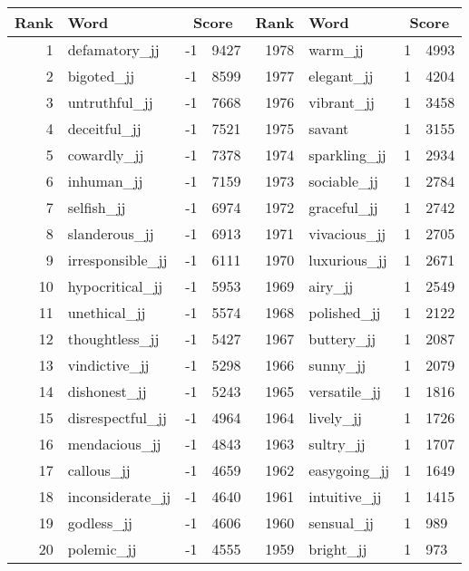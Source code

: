 \begin{table}[tbp]
    \begin{tabular}{| rlr@{.}l | rlr@{.}l |}
    \hline
    \textbf{Rank} & \textbf{Word} & \multicolumn{2}{c|}{\textbf{Score}} & \textbf{Rank} & \textbf{Word} & \multicolumn{2}{c|}{\textbf{Score}} \\
    \hline
    1 & defamatory\_jj & -1 & 9427    &    1978 & warm\_jj & 1 & 4993 \\
    2 & bigoted\_jj & -1 & 8599    &    1977 & elegant\_jj & 1 & 4204 \\
    3 & untruthful\_jj & -1 & 7668    &    1976 & vibrant\_jj & 1 & 3458 \\
    4 & deceitful\_jj & -1 & 7521    &    1975 & savant & 1 & 3155 \\
    5 & cowardly\_jj & -1 & 7378    &    1974 & sparkling\_jj & 1 & 2934 \\
    6 & inhuman\_jj & -1 & 7159    &    1973 & sociable\_jj & 1 & 2784 \\
    7 & selfish\_jj & -1 & 6974    &    1972 & graceful\_jj & 1 & 2742 \\
    8 & slanderous\_jj & -1 & 6913    &    1971 & vivacious\_jj & 1 & 2705 \\
    9 & irresponsible\_jj & -1 & 6111    &    1970 & luxurious\_jj & 1 & 2671 \\
    10 & hypocritical\_jj & -1 & 5953    &    1969 & airy\_jj & 1 & 2549 \\
    11 & unethical\_jj & -1 & 5574    &    1968 & polished\_jj & 1 & 2122 \\
    12 & thoughtless\_jj & -1 & 5427    &    1967 & buttery\_jj & 1 & 2087 \\
    13 & vindictive\_jj & -1 & 5298    &    1966 & sunny\_jj & 1 & 2079 \\
    14 & dishonest\_jj & -1 & 5243    &    1965 & versatile\_jj & 1 & 1816 \\
    15 & disrespectful\_jj & -1 & 4964    &    1964 & lively\_jj & 1 & 1726 \\
    16 & mendacious\_jj & -1 & 4843    &    1963 & sultry\_jj & 1 & 1707 \\
    17 & callous\_jj & -1 & 4659    &    1962 & easygoing\_jj & 1 & 1649 \\
    18 & inconsiderate\_jj & -1 & 4640    &    1961 & intuitive\_jj & 1 & 1415 \\
    19 & godless\_jj & -1 & 4606    &    1960 & sensual\_jj & 1 & 989 \\
    20 & polemic\_jj & -1 & 4555    &    1959 & bright\_jj & 1 & 973 \\

\end{tabular}
\end{table}
